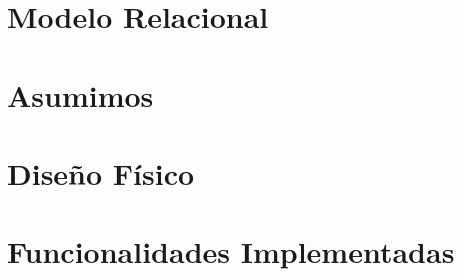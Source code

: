 \documentclass[a4paper, 10pt, twoside]{article}
\begin{document}
\newpage



\section{Modelo Relacional}


\newpage




\section{Asumimos}


\newpage



\section{Diseño Físico}
%

\newpage



\section{Funcionalidades Implementadas}
%

\newpage



\end{document}
